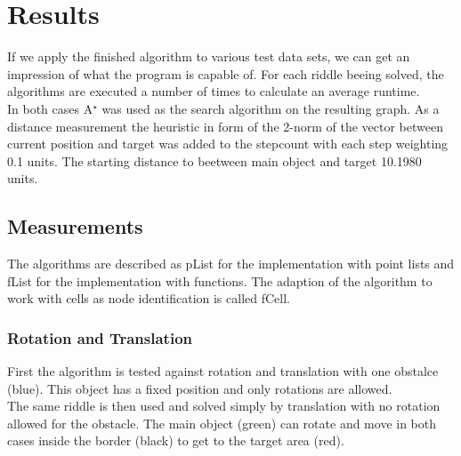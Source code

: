 \chapter{Results}
If we apply the finished algorithm to various test data sets, we can get an impression of what the program is capable of.
For each riddle beeing solved, the algorithms are executed a number of times to calculate an average runtime.\\
In both cases A$^\star$ was used as the search algorithm on the resulting graph. As a distance measurement the heuristic in form of the 2-norm of the vector between current position and target was added to the stepcount with each step weighting 0.1 units. The starting distance to beetween main object and target 10.1980 units.
\section{Measurements}
The algorithms are described as pList for the implementation with point lists and fList for the implementation with functions. The adaption of the algorithm to work with cells as node identification is called fCell.
\subsection{Rotation and Translation}
First the algorithm is tested against rotation and translation with one obstalce (blue). This object has a fixed position and only rotations are allowed.\\
The same riddle is then used and solved simply by translation with no rotation allowed for the obstacle. The main object (green) can rotate and move in both cases inside the border (black) to get to the target area (red).


